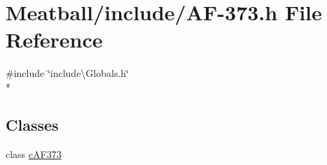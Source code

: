 \hypertarget{_a_f-373_8h}{\section{Meatball/include/\-A\-F-\/373.h File Reference}
\label{_a_f-373_8h}
}
{\ttfamily \#include \char`\"{}include\textbackslash{}\-Globals.\-h\char`\"{}}\\*
\subsection*{Classes}
\begin{DoxyCompactItemize}
\item 
class \hyperlink{classc_a_f373}{c\-A\-F373}
\end{DoxyCompactItemize}
